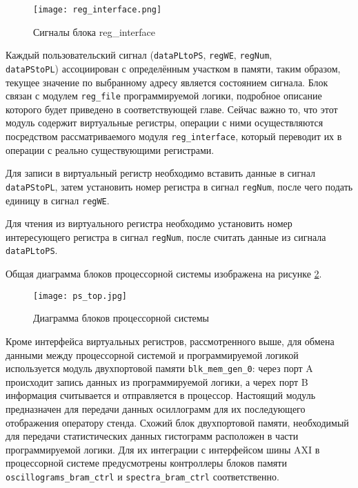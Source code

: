 \begin{figure}[ht]
    \centering
    \texttt{[image: reg\_interface.png]}
    \caption{Сигналы блока reg\_interface}
    \label{fig:reg_interface}
\end{figure}
Каждый пользовательский сигнал (\texttt{dataPLtoPS}, \texttt{regWE}, \texttt{regNum}, \\\texttt{dataPStoPL}) ассоциирован с определённым участком в памяти, таким образом, текущее значение по выбранному адресу является состоянием сигнала. Блок связан с модулем \texttt{reg\_file} программируемой логики, подробное описание которого будет приведено в соответствующей главе. Сейчас важно то, что этот модуль содержит виртуальные регистры, операции с ними осуществляются посредством рассматриваемого модуля \texttt{reg\_interface}, который переводит их в операции с реально существующими регистрами.\par
Для записи в виртуальный регистр необходимо вставить данные в сигнал \texttt{dataPStoPL}, затем установить номер регистра в сигнал \texttt{regNum}, после чего подать единицу в сигнал \texttt{regWE}.\par
Для чтения из виртуального регистра необходимо установить номер интересующего регистра в сигнал \texttt{regNum}, после считать данные из сигнала \texttt{dataPLtoPS}.\par
Общая диаграмма блоков процессорной системы изображена на рисунке \ref{fig:ps_top}.\par
\begin{figure}[ht]
    \centering
    \texttt{[image: ps\_top.jpg]}
    \caption{Диаграмма блоков процессорной системы}
    \label{fig:ps_top}
\end{figure}
Кроме интерфейса виртуальных регистров, рассмотренного выше, для обмена данными между процессорной системой и программируемой логикой используется модуль двухпортовой памяти \texttt{blk\_mem\_gen\_0}: через порт A происходит запись данных из программируемой логики, а черех порт B информация считывается и отправляется в процессор. Настоящий модуль предназначен для передачи данных осиллограмм для их последующего отображения оператору стенда. Схожий блок двухпортовой памяти, необходимый для передачи статистических данных гистограмм расположен в части программируемой логики. Для их интеграции с интерфейсом шины AXI в процессорной системе предусмотрены контроллеры блоков памяти \texttt{oscillograms\_bram\_ctrl} и \texttt{spectra\_bram\_ctrl} соответственно.\par

